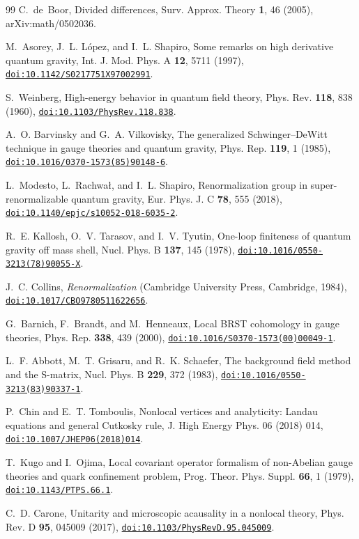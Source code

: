 \documentclass[a4paper,11pt]{article}
\newcommand{\doilink}[1]{\href{https://doi.org/#1}{\nolinkurl{doi:#1}}}
\begin{document}
\begin{thebibliography}{99}
C.~de~Boor, Divided differences, Surv. Approx. Theory \textbf{1}, 46 (2005), arXiv:math/0502036.

M.~Asorey, J.~L. L\'opez, and I.~L. Shapiro, Some remarks on high derivative quantum gravity, Int. J. Mod. Phys. A \textbf{12}, 5711 (1997), \doilink{10.1142/S0217751X97002991}.

S.~Weinberg, High-energy behavior in quantum field theory, Phys. Rev. \textbf{118}, 838 (1960), \doilink{10.1103/PhysRev.118.838}.

A.~O. Barvinsky and G.~A. Vilkovisky, The generalized Schwinger--DeWitt technique in gauge theories and quantum gravity, Phys. Rep. \textbf{119}, 1 (1985), \doilink{10.1016/0370-1573(85)90148-6}.

L.~Modesto, L.~Rachwa{\l}, and I.~L. Shapiro, Renormalization group in super-renormalizable quantum gravity, Eur. Phys. J. C \textbf{78}, 555 (2018), \doilink{10.1140/epjc/s10052-018-6035-2}.

R.~E. Kallosh, O.~V. Tarasov, and I.~V. Tyutin, One-loop finiteness of quantum gravity off mass shell, Nucl. Phys. B \textbf{137}, 145 (1978), \doilink{10.1016/0550-3213(78)90055-X}.

J.~C. Collins, \emph{Renormalization} (Cambridge University Press, Cambridge, 1984), \doilink{10.1017/CBO9780511622656}.

G.~Barnich, F.~Brandt, and M.~Henneaux, Local BRST cohomology in gauge theories, Phys. Rep. \textbf{338}, 439 (2000), \doilink{10.1016/S0370-1573(00)00049-1}.

L.~F. Abbott, M.~T. Grisaru, and R.~K. Schaefer, The background field method and the S-matrix, Nucl. Phys. B \textbf{229}, 372 (1983), \doilink{10.1016/0550-3213(83)90337-1}.

P.~Chin and E.~T. Tomboulis, Nonlocal vertices and analyticity: Landau equations and general Cutkosky rule, J. High Energy Phys. 06 (2018) 014, \doilink{10.1007/JHEP06(2018)014}.

T.~Kugo and I.~Ojima, Local covariant operator formalism of non-Abelian gauge theories and quark confinement problem, Prog. Theor. Phys. Suppl. \textbf{66}, 1 (1979), \doilink{10.1143/PTPS.66.1}.

C.~D. Carone, Unitarity and microscopic acausality in a nonlocal theory, Phys. Rev. D \textbf{95}, 045009 (2017), \doilink{10.1103/PhysRevD.95.045009}.


\end{thebibliography}
\end{document}
